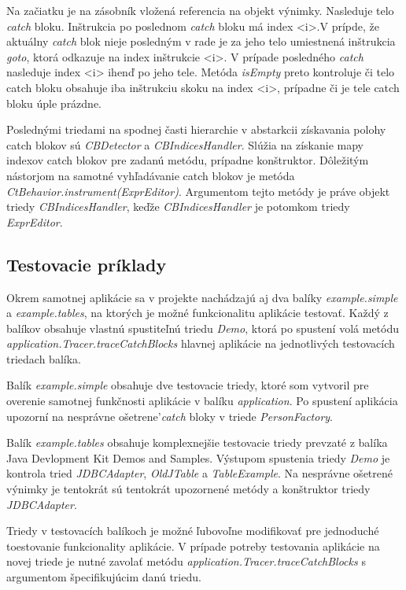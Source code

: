 \documentclass[11pt,final,oneside]{fithesis}
\begin{document}
Na začiatku je na zásobník vložená referencia na objekt výnimky. Nasleduje telo \textit{catch} bloku. Inštrukcia po poslednom \textit{catch} bloku má index <i>.V prípde, že aktuálny \textit{catch} blok nieje posledným v rade je za jeho telo umiestnená inštrukcia \textit{goto}, ktorá odkazuje na index inštrukcie <i>. V prípade posledného \textit{catch} nasleduje index <i> ihenď po jeho tele.
Metóda \textit{isEmpty} preto kontroluje či telo catch bloku obsahuje iba inštrukciu skoku na index <i>, prípadne či je tele catch bloku úple prázdne. 

Poslednými triedami na spodnej časti hierarchie v abstarkcii získavania polohy catch blokov sú \textit{CBDetector} a \textit{CBIndicesHandler}. Slúžia na získanie mapy indexov catch blokov pre zadanú metódu, prípadne konštruktor. Dôležitým nástorjom na samotné vyhľadávanie catch blokov je metóda \textit{CtBehavior.instrument(ExprEditor)}. Argumentom tejto metódy je práve objekt triedy \textit{CBIndicesHandler}, keďže \textit{CBIndicesHandler} je potomkom triedy \textit{ExprEditor}.

\subsection{Testovacie príklady}

Okrem samotnej aplikácie sa v projekte nachádzajú aj dva balíky \textit{example.simple} a \textit{example.tables}, na ktorých je možné funkcionalitu aplikácie testovať. Každý z balíkov obsahuje vlastnú spustiteľnú triedu \textit{Demo}, ktorá po spustení volá metódu \textit{application.Tracer.traceCatchBlocks} hlavnej aplikácie na jednotlivých testovacích triedach balíka. 

Balík \textit{example.simple} obsahuje dve testovacie triedy, ktoré som vytvoril pre overenie samotnej funkčnosti aplikácie v balíku \textit{application}. Po spustení aplikácia upozorní na nesprávne ošetrene'\textit{catch} bloky v triede \textit{PersonFactory}.

Balík \textit{example.tables} obsahuje komplexnejšie testovacie triedy prevzaté z balíka Java Devlopment Kit Demos and Samples. Výstupom spustenia triedy \textit{Demo} je kontrola tried \textit{JDBCAdapter}, \textit{OldJTable} a \textit{TableExample}. Na nesprávne ošetrené výnimky je tentokrát sú tentokrát upozornené metódy a konštruktor triedy \textit{JDBCAdapter}.

Triedy v testovacích balíkoch je možné ľubovoľne modifikovať pre jednoduché toestovanie funkcionality aplikácie. V prípade potreby testovania aplikácie na novej triede je nutné zavolať metódu \textit{application.Tracer.traceCatchBlocks} s argumentom špecifikujúcim danú triedu.
\end{document}
